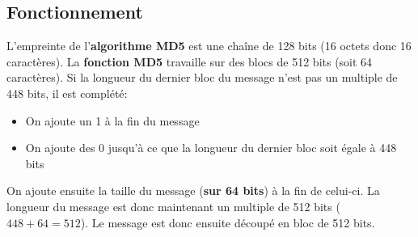 \documentclass[12pt, a4paper]{article}
\begin{document}
\subsection*{Fonctionnement}

L'empreinte de l'\textbf{algorithme MD5} est une chaîne de 128 bits (16 octets donc 16 caractères).
La \textbf{fonction MD5} travaille sur des blocs de 512 bits (soit 64 caractères).
Si la longueur du dernier bloc du message n'est pas un multiple de 448 bits, il est complété:
\begin{itemize}
    \item On ajoute un 1 à la fin du message
    \item On ajoute des 0 jusqu'à ce que la longueur du dernier bloc soit égale à 448 bits
\end{itemize}
\bigskip
On ajoute ensuite la taille du message (\textbf{sur 64 bits}) à la fin de celui-ci.
La longueur du message est donc maintenant un multiple de 512 bits ($448 + 64 = 512$).
Le message est donc ensuite découpé en bloc de 512 bits.
\end{document}
